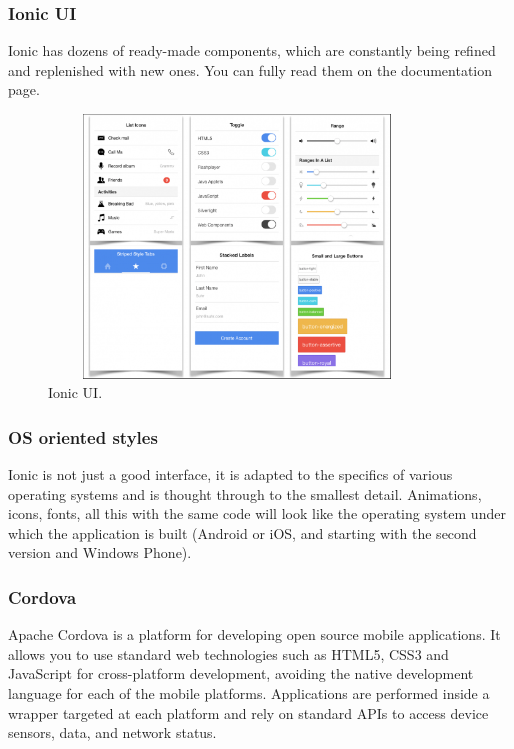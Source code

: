 \subsubsection{Ionic UI}
Ionic has dozens of ready-made components, which are constantly being refined and replenished with new ones. You can fully read them on the documentation page.\cite{IonicUI}

\begin{figure}[h]
\centering
\includegraphics[width=10cm, height=7cm]{img/IonicUI.png}
\caption{Ionic UI.}
\end{figure}

\subsubsection{OS oriented styles}
Ionic is not just a good interface, it is adapted to the specifics of various operating systems and is thought through to the smallest detail. Animations, icons, fonts, all this with the same code will look like the operating system under which the application is built (Android or iOS, and starting with the second version and Windows Phone).\cite{IonicOS}

\subsubsection{Cordova}
Apache Cordova is a platform for developing open source mobile applications. It allows you to use standard web technologies such as HTML5, CSS3 and JavaScript for cross-platform development, avoiding the native development language for each of the mobile platforms. Applications are performed inside a wrapper targeted at each platform and rely on standard APIs to access device sensors, data, and network status. \cite{Cordova}

